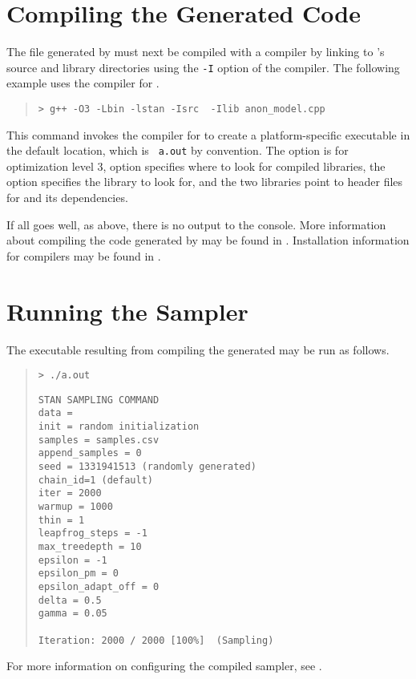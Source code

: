 \section{Compiling the Generated Code}

The file generated by \stanc must next be compiled with a \Cpp
compiler by linking to \Stan's source and library directories using
the {\tt -I} option of the compiler.  The following example 
uses the \clang compiler for \Cpp.
%
\begin{quote}
\begin{Verbatim}[fontshape=sl]
> g++ -O3 -Lbin -lstan -Isrc  -Ilib anon_model.cpp 
\end{Verbatim}
\end{quote}
%
This command invokes the  compiler for \Cpp to create a
platform-specific executable in the default location, which is {\tt
  a.out} by convention.  The  option is for optimization
level 3,  option specifies where to look for compiled
libraries, the  option specifies the library to look for, and
the two  libraries point to header files for \Stan and its
dependencies.

If all goes well, as above, there is no output to the console.  More
information about compiling the \Cpp code generated by \Stan may be
found in .  Installation information for
\Cpp compilers may be found in .

\section{Running the Sampler}

The executable resulting from compiling the generated \Cpp may be run
as follows.
%
\begin{quote}
\begin{Verbatim}[fontshape=sl]
> ./a.out
\end{Verbatim}
%
\begin{Verbatim}
STAN SAMPLING COMMAND
data = 
init = random initialization
samples = samples.csv
append_samples = 0
seed = 1331941513 (randomly generated)
chain_id=1 (default)
iter = 2000
warmup = 1000
thin = 1
leapfrog_steps = -1
max_treedepth = 10
epsilon = -1
epsilon_pm = 0
epsilon_adapt_off = 0
delta = 0.5
gamma = 0.05

Iteration: 2000 / 2000 [100%]  (Sampling)
\end{Verbatim}
\end{quote}
%
For more information on configuring the compiled sampler, see
.

